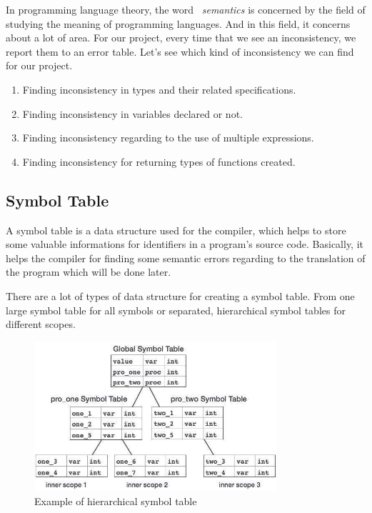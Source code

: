 \documentclass[
  oneside,
  11pt, a4paper,
  footinclude=true,
  headinclude=true,
  cleardoublepage=empty
]{scrbook}
\begin{document}
In programming language theory, the word ~\textit{semantics} is concerned by the field of studying the meaning of programming languages.
And in this field, it concerns about a lot of area.
For our project, every time that we see an inconsistency, we report them to an error table.
Let's see which kind of inconsistency we can find for our project.

\begin{enumerate}
\item Finding inconsistency in types and their related specifications.
\item Finding inconsistency in variables declared or not.
\item Finding inconsistency regarding to the use of multiple expressions.
\item Finding inconsistency for returning types of functions created.
\end{enumerate}




\subsection{Symbol Table}

A symbol table is a data structure used for the compiler, which helps to store some valuable informations for identifiers in a program's source code. Basically, it helps the compiler for finding some semantic errors regarding to the translation of the program which will be done later.

There are a lot of types of data structure for creating a symbol table. From one large symbol table for all symbols or separated, hierarchical symbol tables for different scopes.

\begin{figure}[h!]
  \centering
    \includegraphics[width=0.8\textwidth]{img/symbol_table_hierarchical.jpg}
    \caption{Example of hierarchical symbol table}
    \label{fig:hierarchical_symbol_table}
\end{figure}
\end{document}
